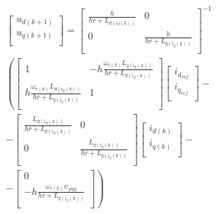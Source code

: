 \documentclass[9pt,conference]{IEEEtran}
\begin{document}
\begin{equation}
	\begin{aligned}
		\begin{bmatrix}
			u_{d(k+1)} \\
			u_{q(k+1)} \\
		\end{bmatrix}
		=
		\begin{bmatrix}
			\frac{h}{hr+L_{d(i_d(k))}} & 0                          \\
			0                          & \frac{h}{hr+L_{q(i_q(k))}} \\
		\end{bmatrix}^{-1} \\
		\left(
		\begin{bmatrix}
				1                                                    & -h\frac{\omega_{e(k)}L_{q(i_q(k))}}{hr+L_{d(i_d(k))}} \\
				h\frac{\omega_{e(k)}L_{d(i_d(k))}}{hr+L_{q(i_q(k))}} & 1                                                     \\
        \end{bmatrix}
		\begin{bmatrix}
				i_{d_{ref}} \\
				i_{q_{ref}} \\
        \end{bmatrix}
        \right. -\\-
		\begin{bmatrix}
				\frac{L_{d(i_d(k))}}{hr+L_{d(i_d(k))}} & 0                                      \\
				0                                      & \frac{L_{q(i_q(k))}}{hr+L_{q(i_q(k))}} \\
        \end{bmatrix}
		\begin{bmatrix}
				i_{d(k)} \\
				i_{q(k)} \\
        \end{bmatrix}
        -\\- \left.
		\begin{bmatrix}
				0                                                 \\
				-h\frac{\omega_{e(k)}\psi_{PM}}{hr+L_{q(i_q(k))}} \\
			\end{bmatrix}
		\right)
	\end{aligned}
	\label{eq:motor_with_inductances_discrete}
\end{equation}
\end{document}
